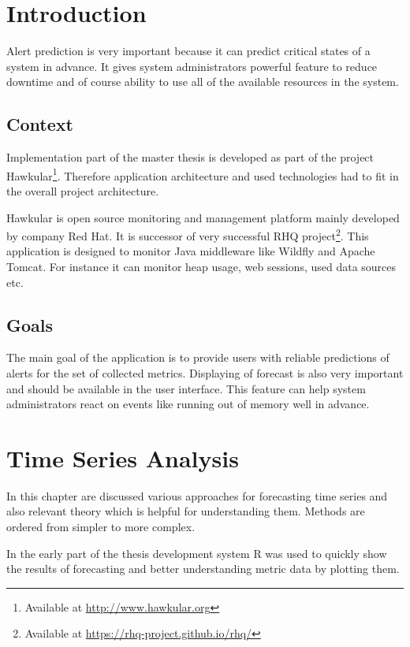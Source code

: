 
\chapter{Introduction} 
Alert prediction is very important because it can predict critical states of a system in
advance. It gives system administrators powerful feature to reduce downtime and
of course ability to use all of the available resources in the system. 

\section{Context}
Implementation part of the master thesis is developed as part of the project
Hawkular\footnote{Available at \url{http://www.hawkular.org}}. 
Therefore application architecture and used technologies had to fit 
in the overall project architecture.

Hawkular is open source monitoring and management platform mainly
developed by company Red Hat. It is successor of very successful RHQ
project\footnote{Available at \url{https://rhq-project.github.io/rhq/}}.
This application is designed to monitor Java middleware 
like Wildfly and Apache Tomcat. For instance it can monitor heap usage, web
sessions, used data sources etc.

\section{Goals}
The main goal of the application is to provide users with reliable predictions
of alerts for the set of collected metrics. Displaying of forecast is also very
important and should be available in the user interface. This feature can help 
system administrators react on events like running out of memory well
in advance.

\chapter{Time Series Analysis}
In this chapter are discussed various approaches for forecasting time series and
also relevant theory which is helpful for understanding them.
Methods are ordered from simpler to more complex. 

In the early part of the thesis
development system R was used to quickly show the results of forecasting and
better understanding metric data by plotting them. 

